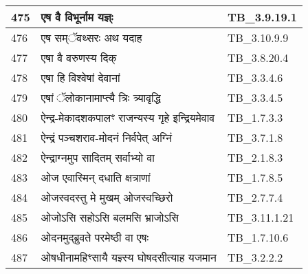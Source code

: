 \documentclass[17pt]{extarticle}
\begin{document}
\begin{longtable}{||p{0.4in}||p{4.9in}||p{0.9in}||}
    \hline
        
    475 & एष वै विभूर्नाम यज्ञ्ः & TB\_3.9.19.1       \\
    
    \hline
        
    476 & एष सम्ॅवथ्सरः अथ यदाह & TB\_3.10.9.9       \\
    
    \hline
        
    477 & एषा वै वरुणस्य दिक् & TB\_3.8.20.4       \\
    
    \hline
        
    478 & एषा हि विश्वेषां देवानां & TB\_3.3.4.6       \\
    
    \hline
        
    479 & एषां ॅलोकानामाप्त्यै त्रिः त्र्यावृद्धि & TB\_3.3.4.5       \\
    
    \hline
        
    480 & ऐन्द्र{-}मेकादशकपालꣳ राजन्यस्य गृहे इन्द्रियमेवाव & TB\_1.7.3.3       \\
    
    \hline
        
    481 & ऐन्द्रं पञ्चशराव{-}मोदनं निर्वपेत् अग्निं & TB\_3.7.1.8       \\
    
    \hline
        
    482 & ऐन्द्राग्नमुप सादितम् सर्वाभ्यो वा & TB\_2.1.8.3       \\
    
    \hline
        
    483 & ओज एवास्मिन् दधाति क्षत्राणां & TB\_1.7.8.5       \\
    
    \hline
        
    484 & ओजस्वदस्तु मे मुखम् ओजस्वच्छिरो & TB\_2.7.7.4       \\
    
    \hline
        
    485 & ओजोऽसि सहोऽसि बलमसि भ्राजोऽसि & TB\_3.11.1.21       \\
    
    \hline
        
    486 & ओदनमुद्ब्रुवते परमेष्ठी वा एषः & TB\_1.7.10.6       \\
    
    \hline
        
    487 & ओषधीनामहिꣳसायै यज्ञ्स्य घोषदसीत्याह यजमान & TB\_3.2.2.2       \\
    

\end{longtable}
\end{document}
